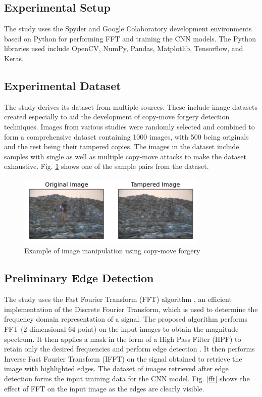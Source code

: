 \documentclass[conference]{IEEEtran}
\begin{document}
\subsection{Experimental Setup}
The study uses the Spyder and Google Colaboratory development environments based on Python for performing FFT and training the CNN models. The Python libraries used include OpenCV, NumPy, Pandas, Matplotlib, Tensorflow, and Keras.  

\subsection{Experimental Dataset}
The study derives its dataset from multiple sources. These include image datasets created especially to aid the development of copy-move forgery detection techniques. Images from various studies \cite{b4}  \cite{b5} \cite{b7} were randomly selected and combined to form a comprehensive dataset containing 1000 images, with 500 being originals and the rest being their tampered copies. The images in the dataset include samples with single as well as multiple copy-move attacks to make the dataset exhaustive. Fig. \ref{tampered} shows one of the sample pairs from the dataset.

\begin{figure}[htpb]
\centerline{\includegraphics[width = 9cm]{tamp_up.png}}
\caption{Example of image manipulation using copy-move forgery}
\label{tampered}
\end{figure}

\subsection{Preliminary Edge Detection}
The study uses the Fast Fourier Transform (FFT) algorithm \cite{b10}, an efficient implementation of the Discrete Fourier Transform, which is used to determine the frequency domain representation of a signal. The proposed algorithm performs FFT (2-dimensional 64 point) on the input images to obtain the magnitude spectrum. It then applies a mask in the form of a High Pass Filter (HPF) to retain only the desired frequencies and perform edge detection \cite{b15}. It then performs Inverse Fast Fourier Transform (IFFT) on the signal obtained to retrieve the image with highlighted edges. The dataset of images retrieved after edge detection forms the input training data for the CNN model. Fig. \ref{fft} shows the effect of FFT on the input image as the edges are clearly visible.
\end{document}
